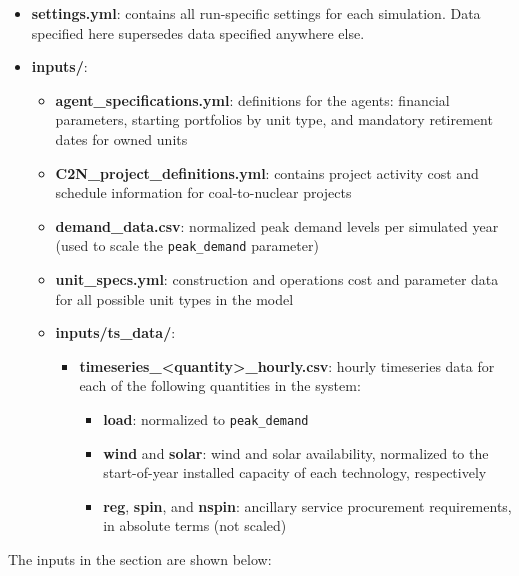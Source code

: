 \begin{itemize}
  \item \textbf{settings.yml}: contains all run-specific settings for each simulation. Data specified here supersedes data specified anywhere else.
  \item \textbf{inputs/}:
  \begin{itemize}
    \item \textbf{agent\_specifications.yml}: definitions for the agents: financial parameters, starting portfolios by unit type, and mandatory retirement dates for owned units
    \item \textbf{C2N\_project\_definitions.yml}: contains project activity cost and schedule information for coal-to-nuclear projects
    \item \textbf{demand\_data.csv}: normalized peak demand levels per simulated year (used to scale the \texttt{peak\_demand} parameter)
    \item \textbf{unit\_specs.yml}: construction and operations cost and parameter data for all possible unit types in the model
    \item \textbf{inputs/ts\_data/}:
    \begin{itemize}
      \item \textbf{timeseries\_<quantity>\_hourly.csv}: hourly timeseries data for each of the following quantities in the system:
      \begin{itemize}
        \item \textbf{load}: normalized to \texttt{peak\_demand}
        \item \textbf{wind} and \textbf{solar}: wind and solar availability, normalized to the start-of-year installed capacity of each technology, respectively
        \item \textbf{reg}, \textbf{spin}, and \textbf{nspin}: ancillary service procurement requirements, in absolute terms (not scaled)
      \end{itemize}
    \end{itemize}
  \end{itemize}
\end{itemize}



The inputs in the  section are shown below:

